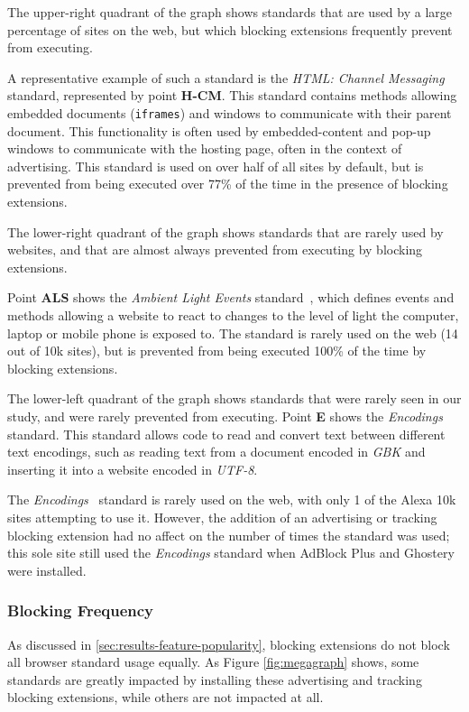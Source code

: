  The upper-right quadrant of the
graph shows standards that are used by a large percentage of sites on the web,
but which blocking extensions frequently prevent from executing.

A representative example of such a standard is the \textit{HTML: Channel
Messaging} ~\cite{htmlcmw3c} standard, represented by point \textbf{H-CM}.
This standard contains \JS methods allowing embedded documents
(\texttt{iframes}) and windows to communicate with their parent document.  This
functionality is often used by embedded-content and pop-up windows to
communicate with the hosting page, often in the context of advertising.  This
standard is used on over half of all sites by default, but is prevented from
being executed over 77\% of the time in the presence of blocking extensions.

 The lower-right quadrant of the
graph shows standards that are rarely used by websites, and that are almost
always prevented from executing by blocking extensions.

Point \textbf{ALS} shows the \emph{Ambient Light Events}
standard~\cite{ambientlightapi}, which defines events and methods allowing a
website to react to changes to the level of light the computer, laptop or
mobile phone is exposed to.  The standard is rarely used on the web (14 out of
10k sites), but is prevented from being executed 100\% of the time by blocking
extensions.

 The lower-left quadrant of
the graph shows standards that were rarely seen in our study, and were rarely
prevented from executing.  Point \textbf{E} shows the
\emph{Encodings}~\cite{encodingw3c} standard.  This standard allows \JS code to
read and convert text between different text encodings, such as reading text
from a document encoded in \emph{GBK} and inserting it into a website encoded
in \emph{UTF-8}.

The \emph{Encodings}~\cite{encodingw3c} standard is rarely used on the web,
with only 1 of the Alexa 10k sites attempting to use it.  However, the addition
of an advertising or tracking blocking extension had no affect on the number of
times the standard was used; this sole site still used the \emph{Encodings}
standard when AdBlock Plus and Ghostery were installed.


\subsubsection{Blocking Frequency} As discussed in
\ref{sec:results-feature-popularity}, blocking extensions do not block all
browser standard usage equally.  As Figure \ref{fig:megagraph} shows, some
standards are greatly impacted by installing these advertising and tracking
blocking extensions, while others are not impacted at all.

